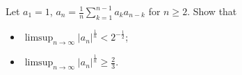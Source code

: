 Let \(a_{1}=1\), \(a_{n}=\frac{1}{n} \sum_{k=1}^{n-1}a_{k}a_{n-k}\) for \(n\geq 2\). Show that
\begin{itemize}
\item[(a)] \(\limsup_{n\to \infty} |a_{n}|^{\frac{1}{n}}<2^{-\frac{1}{2}}\);
\item[(b)] \(\limsup_{n\to \infty} |a_{n}|^{\frac{1}{n}}\geq \frac{2}{3}\).
\end{itemize}